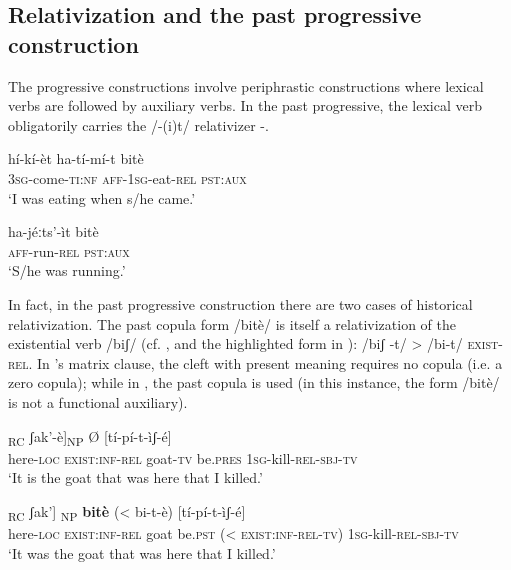 \documentclass[output=paper]{langsci/langscibook}
\begin{document}
\subsection{Relativization and the past progressive construction}\label{sec:mahland:3.2}

The progressive constructions involve periphrastic constructions where lexical verbs are followed by auxiliary verbs. In the past progressive, the lexical verb obligatorily carries the /-(i)t/ relativizer -.

\ea\label{ex:mahland:67}
\gll hí-kí-èt                 ha-tí-mí-t          bitè\\
\textsc{3sg}{}-come-\textsc{ti:nf}   \textsc{aff-1sg}{}-eat-\textsc{rel   pst:aux} \\
\glt `I was eating when s/he came.'
\z

\ea\label{ex:mahland:68}
\gll ha-jéːts'-ìt    bitè\\
\textsc{aff}{}-run-\textsc{rel pst:aux}\\
\glt `S/he was running.'
\z

In fact, in the past progressive construction there are two cases of historical relativization. The past copula form /bitè/ is itself a relativization of the existential verb /biʃ/ (cf. \citealt[318; 461-462]{Ahland2012}, and the highlighted form in ): /biʃ -t/ {\textgreater} /bi-t/ \textsc{exist-rel}. In 's matrix clause, the cleft with present meaning requires no copula (i.e. a zero copula); while in , the past copula is used (in this instance, the form /bitè/ is not a functional auxiliary). 

\ea\label{ex:mahland:69}
\gll [[nà-àt       \textbf{bi-t}]\textsubscript{RC}               ʃak'-è]\textsubscript{NP} Ø    [tí-pí-t-ìʃ-é]
\\
here-\textsc{loc}    \textsc{exist}:\textsc{inf-rel}    goat-\textsc{tv}    be.\textsc{pres}  \textsc{1sg}{}-kill-\textsc{rel-sbj-tv}\\
\glt `It is the goat that was here that I killed.'
\z

\ea\label{ex:mahland:70}
\gll [[nà-àt    \textbf{bi-t}]\textsubscript{ RC}             ʃak']\textsubscript{ NP}    \textbf{bitè}    ({\textless} bi-t-è)      [tí-pí-t-ìʃ-é]\\
here\textsc{{}-loc   exist:inf-rel}   goat    be.\textsc{pst}  ({\textless} \textsc{exist:inf-rel-tv})  \textsc{1sg}{}-kill-\textsc{rel-sbj-tv}\\
\glt `It was the goat that was here that I killed.'
\z
\end{document}
